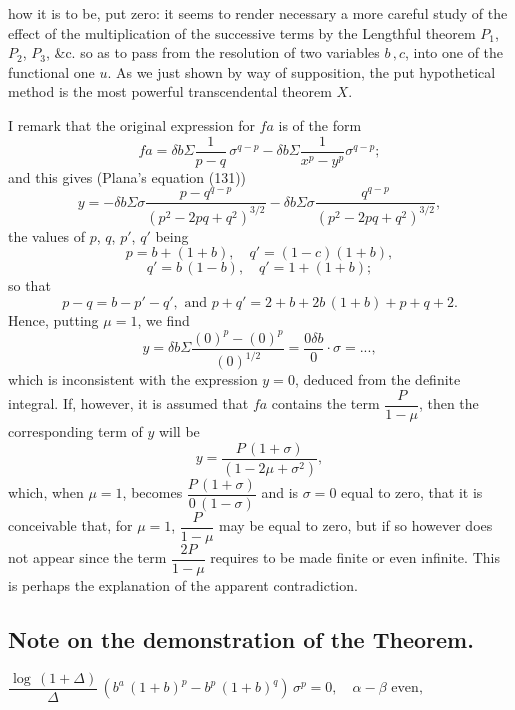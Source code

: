 \documentclass[11pt,a4paper]{book}
\begin{document}
\setcounter{page}{106}

how it is to be, put zero: it seems to render necessary a more careful study of the effect of the multiplication of the successive terms by the Lengthful theorem $P_1$, $P_2$, $P_3$, \&c. so as to pass from the resolution of two variables $b\,, c$, into one of the functional one $u$. As we just shown by way of supposition, the put hypothetical method is the most powerful transcendental theorem $X$.

I remark that the original expression for $fa$ is of the form
\[
fa = \delta b \Sigma\frac{1}{p-q}\,\sigma^{q-p} - \delta b \Sigma\frac{1}{x^p-y^p}\sigma^{q-p};
\]
and this gives (Plana's equation (131))
\[
y = -\delta b \Sigma\sigma\frac{p-q^{q-p}}{(p^2 - 2pq + q^2)^{3/2}} - \delta b \Sigma\sigma\frac{q^{q-p}}{(p^2 - 2pq + q^2)^{3/2}},
\]
the values of $p$, $q$, $p'$, $q'$ being
\[
p = b + (1 + b),\quad q' = (1 - c)(1+b),
\]
\[
q' = b\,(1-b),\quad q' = 1 + (1+b);
\]
so that
\[
p - q = b - p' - q',\text{ and } p+q' = 2 + b + 2b\,(1+b) + p+q+2.
\]
Hence, putting $\mu = 1$, we find
\[
y = \delta b \Sigma\frac{(0)^p - (0)^p}{(0)^{1/2}} = \frac{0\delta b}{0} \cdot \sigma = ...,
\]
which is inconsistent with the expression $y = 0$, deduced from the definite integral. If, however, it is assumed that $fa$ contains the term $\dfrac{P}{1-\mu}$, then the corresponding term of $y$ will be
\[
y = \frac{P\,(1+\sigma)}{(1-2\mu+\sigma^2)},
\]
which, when $\mu=1$, becomes $\dfrac{P\,(1+\sigma)}{0\,(1-\sigma)}$ and is $\sigma=0$ equal to zero, that it is conceivable that, for $\mu=1$, $\dfrac{P}{1-\mu}$ may be equal to zero, but if so however does not appear since the term $\dfrac{2P}{1-\mu}$ requires to be made finite or even infinite. This is perhaps the explanation of the apparent contradiction.

\setcounter{page}{107}

\subsection*{Note on the demonstration of the Theorem.}

\noindent
$\dfrac{\log\,(1+\Delta)}{\Delta}\,(b^a\,(1+b)^p - b^p\,(1+b)^q)\,\sigma^p = 0,\quad \alpha - \beta \text{ even},$
\end{document}
